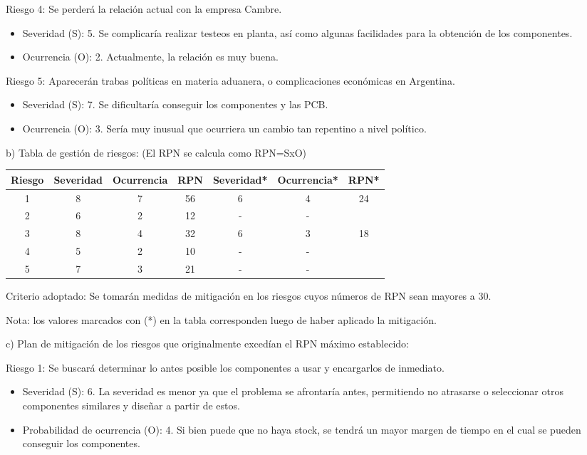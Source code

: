 \documentclass[
11pt, %
]{charter}
\begin{document}
Riesgo 4: Se perderá la relación actual con la empresa Cambre.
\begin{itemize}
	\item Severidad (S): 5. Se complicaría realizar testeos en planta, así como algunas facilidades para la obtención de los componentes.
	\item Ocurrencia (O): 2. Actualmente, la relación es muy buena.
\end{itemize}

Riesgo 5: Aparecerán trabas políticas en materia aduanera, o complicaciones económicas en Argentina.
\begin{itemize}
	\item Severidad (S): 7. Se dificultaría conseguir los componentes y las PCB.
	\item Ocurrencia (O): 3. Sería muy inusual que ocurriera un cambio tan repentino a nivel político.
\end{itemize}

b) Tabla de gestión de riesgos:      (El RPN se calcula como RPN=SxO)

\begin{table}[htpb]
\centering
\begin{tabular}{|c|c|c|c|c|c|c|}
\hline
\rowcolor[HTML]{C0C0C0} 
Riesgo & Severidad & Ocurrencia & RPN & Severidad* & Ocurrencia* & RPN* \\ \hline
    1  & 8  & 7  &  56   &  6  & 4   & 24     \\ \hline
    2  & 6  & 2  &  12   &  -  &  -  &      \\ \hline
    3  & 8  & 4  &  32   &  6  &  3  & 18     \\ \hline
    4  & 5  & 2  &  10   &  -  &  -  &      \\ \hline
    5  & 7  & 3  &  21   &  -  &  -  &      \\ \hline
\end{tabular}%
\end{table}

Criterio adoptado: 
Se tomarán medidas de mitigación en los riesgos cuyos números de RPN sean mayores a 30.

Nota: los valores marcados con (*) en la tabla corresponden luego de haber aplicado la mitigación.

c) Plan de mitigación de los riesgos que originalmente excedían el RPN máximo establecido:
 
Riesgo 1: Se buscará determinar lo antes posible los componentes a usar y encargarlos de inmediato.
\begin{itemize}
  \item Severidad (S): 6. La severidad es menor ya que el problema se afrontaría antes, permitiendo no atrasarse o seleccionar otros componentes similares y diseñar a partir de estos.
  \item Probabilidad de ocurrencia (O): 4. Si bien puede que no haya stock, se tendrá un mayor margen de tiempo en el cual se pueden conseguir los componentes.
\end{itemize}
  
\end{document}
